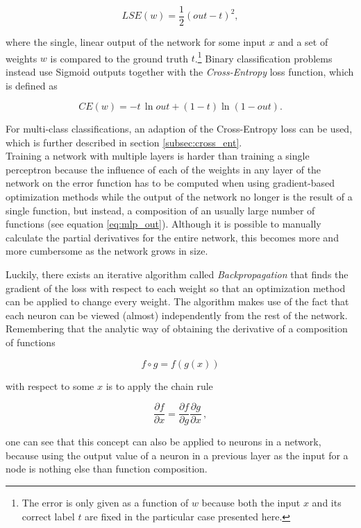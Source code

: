 \[ LSE(w) = \frac{1}{2} \left ( out - t \right )^2, \]

\noindent where the single, linear output of the network for some input $x$ and a set of weights $w$ is compared to the ground truth $t$.\footnote{The error is only given as a function of $w$ because both the input $x$ and its correct label $t$ are fixed in the particular case presented here.} Binary classification problems instead use Sigmoid outputs together with the \textit{Cross-Entropy} loss function, which is defined as 

\[ CE(w) =  -t \, \ln out + (1 - t) \ln (1 - out). \]

\noindent For multi-class classifications, an adaption of the Cross-Entropy loss can be used, which is further described in section \ref{subsec:cross_ent}. \cite[pp. 232-236]{bishop_pattern}\\

\noindent Training a network with multiple layers is harder than training a single perceptron because the influence of each of the weights in any layer of the network on the error function has to be computed when using gradient-based optimization methods while the output of the network no longer is the result of a single function, but instead, a composition of an usually large number of functions (see equation \ref{eq:mlp_out}). Although it is possible to manually calculate the partial derivatives for the entire network, this becomes more and more cumbersome as the network grows in size.

Luckily, there exists an iterative algorithm called \textit{Backpropagation} \cite{backprop} that finds the gradient of the loss with respect to each weight so that an optimization method can be applied to change every weight. The algorithm makes use of the fact that each neuron can be viewed (almost) independently from the rest of the network. Remembering that the analytic way of obtaining the derivative of a composition of functions 

\[ f \circ g = f(g(x)) \]

\noindent with respect to some $x$ is to apply the chain rule

\[ \frac{\partial f}{\partial x} =\frac{\partial f}{\partial g} \frac{\partial g}{\partial x} \, , \]

\noindent one can see that this concept can also be applied to neurons in a network, because using the output value of a neuron in a previous layer as the input for a node is nothing else than function composition.\\

